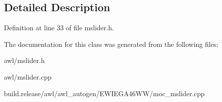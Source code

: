 \subsection{Detailed Description}


Definition at line 33 of file mslider.\+h.



The documentation for this class was generated from the following files\+:\begin{DoxyCompactItemize}
\item 
awl/mslider.\+h\item 
awl/mslider.\+cpp\item 
build.\+release/awl/awl\+\_\+autogen/\+E\+W\+I\+E\+G\+A46\+W\+W/moc\+\_\+mslider.\+cpp\end{DoxyCompactItemize}
